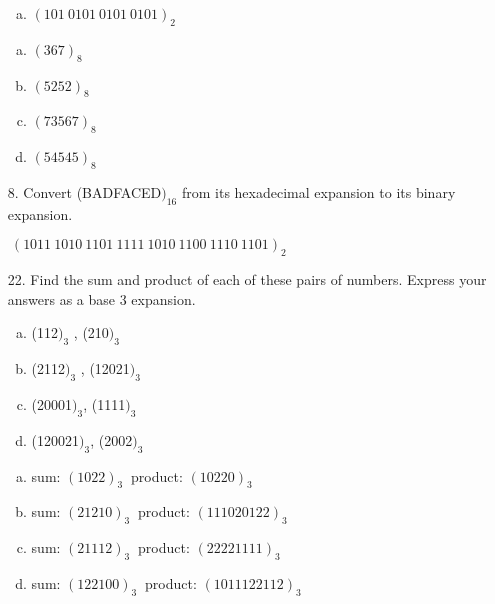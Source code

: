 \begin{itemize}
\begin{enumerate}[a.]
              \item $(101\ 0101\ 0101\ 0101)_2$
          \end{enumerate}
          \answer
          \begin{enumerate}[a.]
              \item $(367)_8$
              \item $(5252)_8$
              \item $(73567)_8$
              \item $(54545)_8$
          \end{enumerate}
    \item[8.] Convert (BADFACED$)_{16}$ from its hexadecimal expansion to its binary expansion.

          \answer $\ (1011\ 1010\ 1101\ 1111\ 1010\ 1100\ 1110\ 1101)_2$
    \item[22.] Find the sum and product of each of these pairs of numbers. Express your answers as a base 3 expansion.
          \begin{enumerate}[a.]
              \item (112$)_3$ , (210$)_3$
              \item (2112$)_3$ , (12021$)_3$
              \item (20001$)_3$, (1111$)_3$
              \item (120021$)_3$, (2002$)_3$
          \end{enumerate}
          \answer
          \begin{enumerate}[a.]
              \item sum: $(1022)_3\ $ product: $(10220)_3$
              \item sum: $(21210)_3\ $ product: $(111020122)_3$
              \item sum: $(21112)_3\ $ product: $(22221111)_3$
              \item sum: $(122100)_3\ $ product: $(1011122112)_3$
          \end{enumerate}
\end{itemize}

